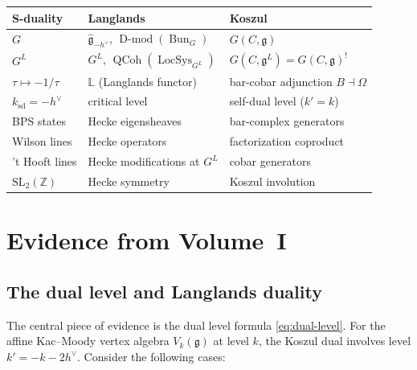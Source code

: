 \documentclass[11pt]{article}
\theoremstyle{definition}
\theoremstyle{remark}
\DeclareMathOperator{\Bun}{Bun}
\DeclareMathOperator{\LocSys}{LocSys}
\DeclareMathOperator{\QCoh}{QCoh}
\DeclareMathOperator{\Dmod}{D\text{-}mod}
\newcommand{\g}{\mathfrak{g}}
\newcommand{\gL}{\mathfrak{g}^L}
\newcommand{\hv}{h^\vee}
\begin{document}
\renewcommand{\arraystretch}{1.5}
\begin{center}
\begin{tabular}{lll}
 \hline
 \textbf{S-duality} & \textbf{Langlands} & \textbf{Koszul} \\
 \hline
 $G$ & $\hat{\g}_{-\hv}$, $\Dmod(\Bun_G)$ & $G(C,\g)$ \\
 $G^L$ & $G^L$, $\QCoh(\LocSys_{G^L})$ & $G(C,\gL) = G(C,\g)^!$ \\
 $\tau \mapsto -1/\tau$ & $\mathbb{L}$ (Langlands functor) &
 bar-cobar adjunction $B \dashv \Omega$ \\
 $k_{\mathrm{sd}} = -\hv$ & critical level & self-dual level
 ($k' = k$) \\
 BPS states & Hecke eigensheaves & bar-complex generators \\
 Wilson lines & Hecke operators & factorization coproduct \\
 't Hooft lines & Hecke modifications at $G^L$ & cobar generators \\
 $\mathrm{SL}_2(\mathbb{Z})$ & Hecke symmetry & Koszul involution \\
 \hline
\end{tabular}
\end{center}


\section{Evidence from Volume~I}
\label{sec:evidence-vol1}

\subsection{The dual level and Langlands duality}

The central piece of evidence is the dual level formula
\eqref{eq:dual-level}. For the affine Kac--Moody vertex algebra
$V_k(\g)$ at level $k$, the Koszul dual involves level $k' = -k - 2\hv$.
Consider the following cases:
\end{document}
